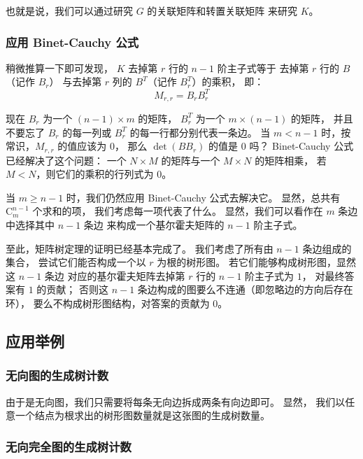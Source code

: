 \documentclass[UTF8]{article}
\begin{document}
	也就是说，我们可以通过研究 $G$ 的关联矩阵和转置关联矩阵
	来研究 $K$。

	\subsubsection{应用 Binet-Cauchy 公式}

	稍微推算一下即可发现，
	$K$ 去掉第 $r$ 行的 $n - 1$ 阶主子式等于
	去掉第 $r$ 行的 $B$（记作 $B_r$）
	与去掉第 $r$ 列的 $B^T$（记作 $B^T_r$）的乘积，
	即：
	$$
	M_{r, r} = B_r B^T_r
	$$

	现在 $B_r$ 为一个 $(n - 1) \times m$ 的矩阵，
	$B^T_r$ 为一个 $m \times (n - 1)$ 的矩阵，
	并且不要忘了 $B_r$ 的每一列或 $B^T_r$ 的每一行都分别代表一条边。
	当 $m < n - 1$ 时，按常识，$M_{r, r}$ 的值应该为 $0$，
	那么 $\det(B B_r)$ 的值是 $0$ 吗？
	Binet-Cauchy 公式已经解决了这个问题：
	一个 $N \times M$ 的矩阵与一个 $M \times N$ 的矩阵相乘，
	若 $M < N$，则它们的乘积的行列式为 $0$。

	当 $m \ge n - 1$ 时，我们仍然应用 Binet-Cauchy 公式去解决它。
	显然，总共有 $\mathrm{C}_{m}^{n - 1}$ 个求和的项，
	我们考虑每一项代表了什么。
	显然，我们可以看作在 $m$ 条边中选择其中 $n - 1$ 条边
	来构成一个基尔霍夫矩阵的 $n - 1$ 阶主子式。

	\bigskip

	至此，矩阵树定理的证明已经基本完成了。
	我们考虑了所有由 $n - 1$ 条边组成的集合，
	尝试它们能否构成一个以 $r$ 为根的树形图。
	若它们能够构成树形图，显然这 $n - 1$ 条边
	对应的基尔霍夫矩阵去掉第 $r$ 行的 $n - 1$ 阶主子式为 $1$，
	对最终答案有 $1$ 的贡献；
	否则这 $n - 1$ 条边构成的图要么不连通（即忽略边的方向后存在环），
	要么不构成树形图结构，对答案的贡献为 $0$。

	\bigskip

	{}

	\subsection{应用举例}

	\subsubsection{无向图的生成树计数}

	由于是无向图，我们只需要将每条无向边拆成两条有向边即可。
	显然，
	我们以任意一个结点为根求出的树形图数量就是这张图的生成树数量。

	\subsubsection{无向完全图的生成树计数}
\end{document}

